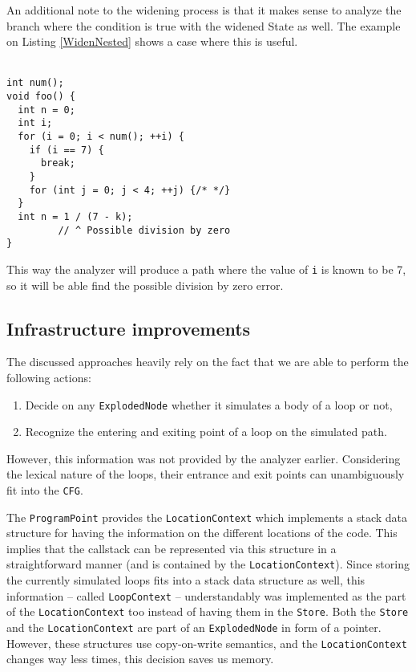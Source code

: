 An additional note to the widening process is that it makes sense to analyze the branch 
where the condition is true with the widened State as well. The example on 
Listing \ref{WidenNested} shows a case where this is useful.
\\
\\
\begin{lstlisting}
int num();
void foo() {
  int n = 0;
  int i;
  for (i = 0; i < num(); ++i) {
    if (i == 7) {
      break;
    }
    for (int j = 0; j < 4; ++j) {/* */}
  }
  int n = 1 / (7 - k);
         // ^ Possible division by zero
}\end{lstlisting}
This way the analyzer will produce a path where the value of \texttt{i} is 
known
to be 7, so it will be able find the possible division by zero error.
	
\subsection{Infrastructure improvements}\label{sec:inf}
The discussed approaches heavily rely on the fact that we are able to 
perform the following actions:
\begin{enumerate}
	\item Decide on any \texttt{ExplodedNode} whether it simulates a body of a 
	loop or not,
	\item Recognize the entering and exiting point of a loop on the simulated 
	path.
\end{enumerate}

However, this information was not provided by the analyzer earlier. Considering the 
lexical nature of the loops, their entrance and exit points can unambiguously 
fit into the \texttt{CFG}. 

The \texttt{ProgramPoint} provides the \texttt{LocationContext} which implements a stack data structure for having the information on the different locations of the code.  This implies that the callstack can be represented via this structure in a straightforward manner (and is contained by the \texttt{LocationContext}).
Since storing the currently simulated loops fits into a stack data structure as well, this information -- called \texttt{LoopContext} -- understandably was implemented as the part of the \texttt{LocationContext} too instead of having them in the \texttt{Store}. Both the \texttt{Store} and the \texttt{LocationContext} are part of an \texttt{ExplodedNode} in form of a pointer. However, these structures use copy-on-write semantics, and the \texttt{LocationContext} changes way less times, this decision saves us memory. 